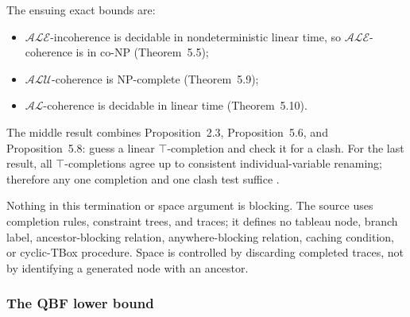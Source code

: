 The ensuing exact bounds are:
\begin{itemize}
\item \(\mathcal{ALE}\)-incoherence is decidable in nondeterministic linear
      time, so \(\mathcal{ALE}\)-coherence is in co-NP
      (Theorem~5.5);
\item \(\mathcal{ALU}\)-coherence is NP-complete
      (Theorem~5.9);
\item \(\mathcal{AL}\)-coherence is decidable in linear time
      (Theorem~5.10).
\end{itemize}
The middle result combines Proposition~2.3, Proposition~5.6, and
Proposition~5.8: guess a linear \(\top\)-completion and check it for a clash.
For the last result, all \(\top\)-completions agree up to consistent
individual-variable renaming; therefore any one completion and one clash test
suffice
\cite[pp.~15--17]{SchmidtSchaussSmolka1991}.

Nothing in this termination or space argument is blocking.  The source uses
completion rules, constraint trees, and traces; it defines no tableau node,
branch label, ancestor-blocking relation, anywhere-blocking relation, caching
condition, or cyclic-TBox procedure.  Space is controlled by discarding
completed traces, not by identifying a generated node with an ancestor.

\subsubsection{The QBF lower bound}

